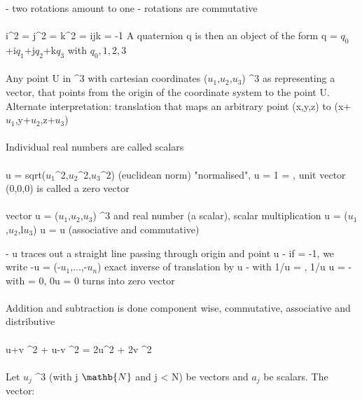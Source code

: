 \documentclass{article}
\begin{document}
- two rotations amount to one
- rotations are commutative
\\
\\
\math i^2 = j^2 = k^2 = ijk = -1 \)
\newline A quaternion q is then an object of the form \math q = $q_0$+i$q_1$+j$q_2$+k$q_3$\) with \math $q_0,1,2,3$ \in \Re\)
\\
\\
Any point U in \Re^3\) with cartesian coordinates \math ($u_1$,$u_2$,$u_3$) \in \Re^3\) as representing a vector, that points from the origin of the coordinate system to the point U.
\newline Alternate interpretation: translation that maps an arbitrary point \math (x,y,z)\) to \math (x+$u_1$,y+$u_2$,z+$u_3$)\)
\\
\\
Individual real numbers \alpha \in \Re\) are called scalars
\\
\\
\vert u \vert = sqrt($u_1$^2,$u_2$^2,$u_3$^2)\) (euclidean norm)
\newline "normalised", \vert u \vert = 1 = \), unit vector
\newline \math(0,0,0)\) is called a zero vector
\\
\\
vector \math u = ($u_1$,$u_2$,$u_3$) \in \Re^3\) and real number \lambda\) (a scalar), scalar multiplication
\newline \math \lambda u = (\lambda$u_1$,\lambda$u_2$,l\ambda$u_3$)
\newline \therefore \vert \lambda u \vert = \vert \lambda \vert \vert u \vert\) (associative and commutative)

- \lambda u\) traces out a straight line passing through origin and point u
- if \lambda = -1\), we write \math -u = (-$u_1$,...,-$u_n$)\) exact inverse of translation by u
- with 1/\vert u \vert = \lambda, 1/\vert u \vert u = \)
- with \lambda = 0, 0u = 0\) turns into zero vector
\\
\\
Addition and subtraction is done component wise, commutative, associative and distributive
\\
\\
\vert u+v \vert^2 + \vert u-v \vert^2 = 2\vert u\vert^2 + 2\vert v \vert^2\)
\\
\\
Let $u_j$ \in \Re^3\) (with \math j \in $\mathb{N}$\) and \math j < N\)) be vectors and $a_j$ be scalars. The vector:
\end{document}
